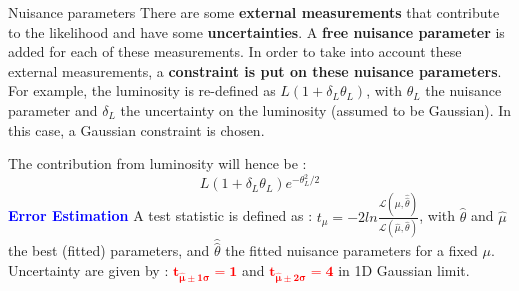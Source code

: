 \begin{frame}{Nuisance parameters}
There are some {\bf external measurements}  that contribute to the likelihood and have some {\bf uncertainties}. 
A {\bf free nuisance parameter} is added for each of these measurements.
In order  to take into account these external measurements, a {\bf constraint is put on these nuisance parameters}. 
\vfill
For example, the luminosity is re-defined as  $L(1+\delta_L \theta_L)$, with $\theta_L$ the nuisance parameter and $\delta_L$ the uncertainty on the luminosity (assumed to be Gaussian).
In this case, a Gaussian constraint is chosen.

The contribution from luminosity will hence be :
$$L(1+\delta_L \theta_L)e^{-\theta_L^2/2}$$
\vfill
\textcolor{blue}{\bf Error Estimation}\newline
A test statistic is defined as : $t_\mu=-2ln\frac{\mathcal{L}(\mu,\hat{\hat{\theta}})}{\mathcal{L}(\hat{\mu},\hat{\theta})}$, with $\hat{\theta}$ and $\hat{\mu}$ the best (fitted) parameters, and $\hat{\hat{\theta}}$ the fitted nuisance parameters for a fixed $\mu$.\newline
Uncertainty are given by : \textcolor{red}{$\mathbf{t_{\hat{\mu}\pm 1\sigma}=1}$} and \textcolor{red}{$\mathbf{t_{\hat{\mu}\pm 2\sigma}=4}$} in 1D Gaussian limit.
\end{frame}

